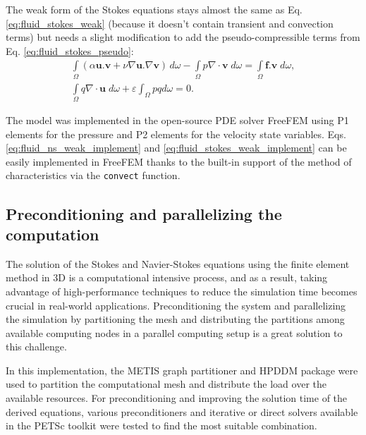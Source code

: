 The weak form of the Stokes equations stays almost the same as Eq. \ref{eq:fluid_stokes_weak} (because it doesn't contain transient and convection terms) but needs a slight modification to add the pseudo-compressible terms from Eq. \ref{eq:fluid_stokes_pseudo}:
\begin{equation} \label{eq:fluid_stokes_weak_implement}
\begin{array}{*{20}{l}}
\displaystyle  {\int\limits_\Omega  {(\alpha {\mathbf{u}}.{\mathbf{v}} + \nu\nabla {\mathbf{u}}.\nabla {\mathbf{v}})\,} d\omega  - \int\limits_\Omega  {p\nabla\cdot{\mathbf{v}}\;d\omega  = } \int\limits_\Omega  {{\mathbf{f}}.{\mathbf{v}}\;d\omega,} } \\ 
\displaystyle  {\int\limits_\Omega  {q\nabla\cdot{\mathbf{u}}\;d\omega +\varepsilon \int_{\Omega} p q d \omega  = 0}.} 
\end{array}
\end{equation}

The model was implemented in the open-source PDE solver FreeFEM \cite{Hecht2012} using P1 elements for the pressure and P2 elements for the velocity state variables. Eqs. \ref{eq:fluid_ns_weak_implement} and \ref{eq:fluid_stokes_weak_implement} can be easily implemented in FreeFEM thanks to the built-in support of the method of characteristics via the \verb|convect| function. 


\subsection{Preconditioning and parallelizing the computation}

The solution of the Stokes and Navier-Stokes equations using the finite element method in 3D is a computational intensive process, and as a result, taking advantage of high-performance techniques to reduce the simulation time becomes crucial in real-world applications. Preconditioning the system and parallelizing the simulation by partitioning the mesh and distributing the partitions among available computing nodes in a parallel computing setup is a great solution to this challenge.

In this implementation, the METIS \cite{METIS1998} graph partitioner and HPDDM package \cite{Jolivet2013} were used to partition the computational mesh and distribute the load over the available resources. For preconditioning and improving the solution time of the derived equations, various preconditioners and iterative or direct solvers available in the PETSc toolkit \cite{petsc} were tested to find the most suitable combination.

